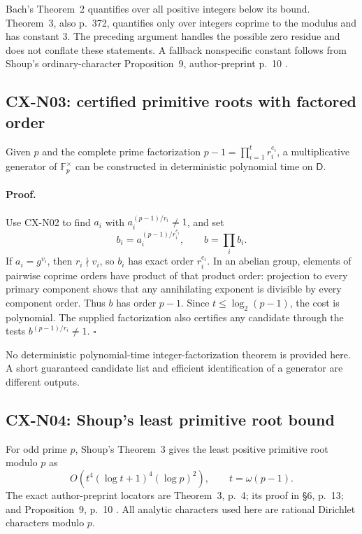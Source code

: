 Bach's Theorem~2 quantifies over all positive integers below its bound.
Theorem~3, also p.~372, quantifies only over integers coprime to the modulus
and has constant \(3\). The preceding argument handles the possible zero
residue and does not conflate these statements. A fallback nonspecific
constant follows from Shoup's ordinary-character Proposition~9,
author-preprint p.~10 \cite{CXNShoup92}.

\subsection{CX-N03: certified primitive roots with factored order}
\label{cx-n03}

Given \(p\) and the complete prime factorization
\(p-1=\prod_{i=1}^t r_i^{e_i}\), a multiplicative generator of
\(\mathbb F_p^\times\) can be constructed in deterministic polynomial time
on \(\mathsf D\).

\paragraph{Proof.}
Use CX-N02 to find \(a_i\) with \(a_i^{(p-1)/r_i}\ne1\), and set
\[
              b_i=a_i^{(p-1)/r_i^{e_i}},\qquad b=\prod_i b_i .
\]
If \(a_i=g^{v_i}\), then \(r_i\nmid v_i\), so \(b_i\) has exact order
\(r_i^{e_i}\). In an abelian group, elements of pairwise coprime orders
have product of that product order: projection to every primary component
shows that any annihilating exponent is divisible by every component
order. Thus \(b\) has order \(p-1\). Since \(t\leq\log_2(p-1)\), the cost
is polynomial. The supplied factorization also certifies any candidate
through the tests \(b^{(p-1)/r_i}\ne1\). \(\square\)

No deterministic polynomial-time integer-factorization theorem is
provided here. A short guaranteed candidate list and efficient
identification of a generator are different outputs.

\subsection{CX-N04: Shoup's least primitive root bound}
\label{cx-n04}

For odd prime \(p\), Shoup's Theorem~3 gives the least positive primitive root modulo \(p\) as
\[
 O\!\left(t^4(\log t+1)^4(\log p)^2\right),\qquad t=\omega(p-1).
\]
The exact author-preprint locators are Theorem~3, p.~4; its proof in
\S6, p.~13; and Proposition~9, p.~10 \cite{CXNShoup92}.
All analytic characters used here are rational Dirichlet characters
modulo \(p\).

